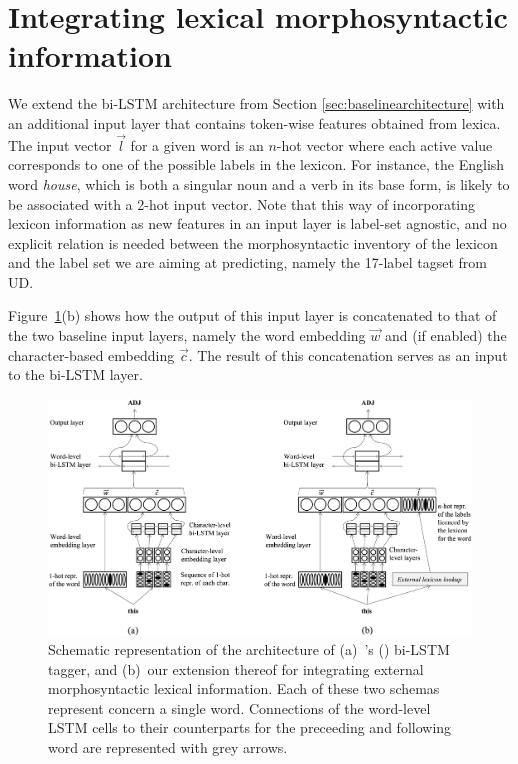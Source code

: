\documentclass[11pt,letterpaper]{article}
\begin{document}
\section{Integrating lexical morphosyntactic information}

We extend the bi-LSTM architecture from Section \ref{sec:baselinearchitecture} with an additional input layer that
contains token-wise features obtained from lexica. The input vector $\vec{l}$ for a given word is an $n$-hot vector
where each active value corresponds to one of the possible labels in the lexicon. For instance, the English word
\textit{house}, which is both a singular noun and a verb in its base form, is likely to be associated with a 2-hot input
vector.  Note that this way of incorporating lexicon information as new features in an input layer is label-set
agnostic, and no explicit relation is needed between the morphosyntactic inventory of the lexicon and the label set we
are aiming at predicting, namely the 17-label tagset from UD.

Figure~\ref{fig:schema}(b) shows how the output of this input layer is concatenated to that of
  the two baseline input layers, namely the word embedding $\vec{w}$ and (if enabled) the character-based embedding
  $\vec{c}$. The result of this concatenation serves as an input to the bi-LSTM layer.

\begin{figure}
\includegraphics[width=\linewidth]{emnlp17schema}
\caption{Schematic representation of the architecture of (a)~\citeauthor{plank16}'s (\citeyear{plank16}) bi-LSTM tagger,
and (b)~our extension thereof for integrating external morphosyntactic lexical information. Each of these two schemas
represent concern a single word. Connections of the word-level LSTM cells to their counterparts for the preceeding and
following word are represented with grey arrows.}\label{fig:schema}
\end{figure}
\end{document}
